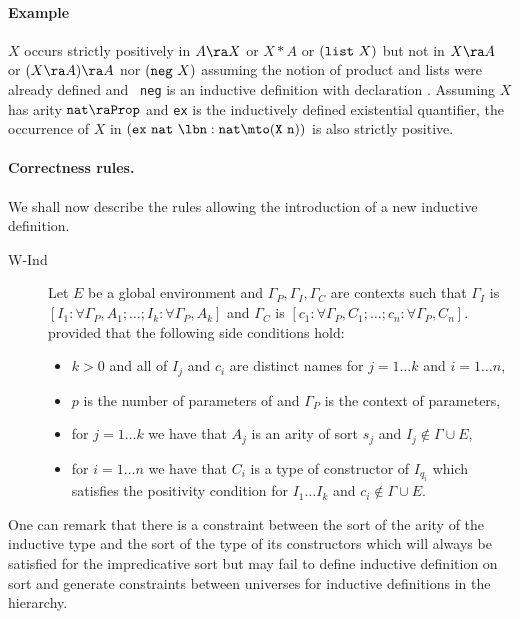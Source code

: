 \paragraph{Example}

$X$ occurs strictly positively in $A\ra X$ or $X*A$ or $({\tt list}~
X)$ but not in $X \ra A$ or $(X \ra A)\ra A$ nor $({\tt neg}~X)$
assuming the notion of product and lists were already defined and {\tt
  neg} is an inductive definition with declaration .  Assuming
$X$ has arity ${\tt nat \ra Prop}$ and {\tt ex} is the inductively
defined existential quantifier, the occurrence of $X$ in ${\tt (ex~
  nat~ \lb n:nat\mto (X~ n))}$ is also strictly positive.

\paragraph{Correctness rules.}
We shall now describe the rules allowing the introduction of a new
inductive definition.

\begin{description}
\item[W-Ind] Let $E$ be a global environment and
  $\Gamma_P,\Gamma_I,\Gamma_C$ are contexts such that
  $\Gamma_I$ is $[I_1:\forall \Gamma_P,A_1;\ldots;I_k:\forall
  \Gamma_P,A_k]$ and $\Gamma_C$ is 
  $[c_1:\forall \Gamma_P,C_1;\ldots;c_n:\forall \Gamma_P,C_n]$. 
provided that the following side conditions hold:
\begin{itemize}
\item $k>0$ and all of $I_j$ and $c_i$ are distinct names for $j=1\ldots  k$ and $i=1\ldots  n$,
\item $p$ is the number of parameters of 
  and $\Gamma_P$ is the context of parameters, 
\item for $j=1\ldots  k$ we have that $A_j$ is an arity of sort $s_j$ and $I_j
  \notin \Gamma \cup E$,
\item for $i=1\ldots  n$ we have that $C_i$ is a type of constructor of
  $I_{q_i}$ which satisfies the positivity condition for $I_1 \ldots  I_k$
  and $c_i \notin \Gamma \cup E$.
\end{itemize}
\end{description}
One can remark that there is a constraint between the sort of the
arity of the inductive type and the sort of the type of its
constructors which will always be satisfied for the impredicative sort
{\Prop} but may fail to define inductive definition 
on sort \Set{} and generate constraints between universes for
inductive definitions in the {\Type} hierarchy.


